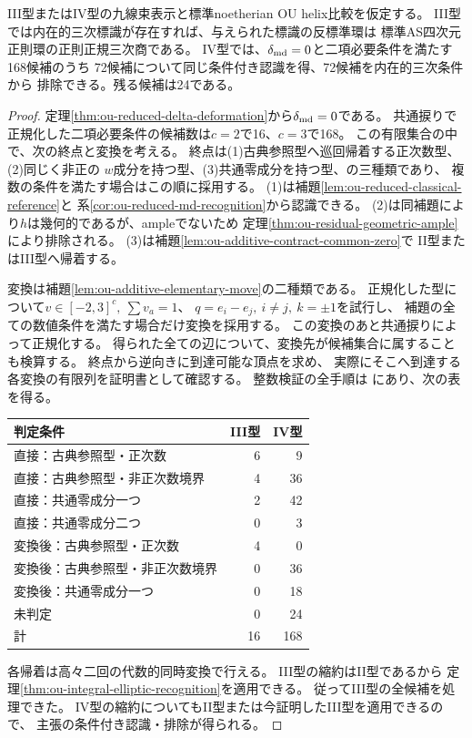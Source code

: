 \begin{theorem}[III型の完全認識とIV型の代数的帰着]
\label{thm:ou-additive-partial-recognition}
III型またはIV型の九線束表示と標準noetherian OU helix比較を仮定する。
III型では内在的三次標識が存在すれば、与えられた標識の反標準環は
標準AS四次元正則環の正則正規三次商である。
IV型では、$\delta_{\rm md}=0$と二項必要条件を満たす168候補のうち
72候補について同じ条件付き認識を得、72候補を内在的三次条件から
排除できる。残る候補は24である。
\end{theorem}
\begin{proof}
定理\ref{thm:ou-reduced-delta-deformation}から$\delta_{\rm md}=0$である。
共通捩りで正規化した二項必要条件の候補数は$c=2$で16、$c=3$で168。
この有限集合の中で、次の終点と変換を考える。
終点は(1)古典参照型へ巡回帰着する正次数型、(2)同じく非正の
$w$成分を持つ型、(3)共通零成分を持つ型、の三種類であり、
複数の条件を満たす場合はこの順に採用する。
(1)は補題\ref{lem:ou-reduced-classical-reference}と
系\ref{cor:ou-reduced-md-recognition}から認識できる。
(2)は同補題により$h$は幾何的であるが、ampleでないため
定理\ref{thm:ou-residual-geometric-ample}により排除される。
(3)は補題\ref{lem:ou-additive-contract-common-zero}で
II型またはIII型へ帰着する。

変換は補題\ref{lem:ou-additive-elementary-move}の二種類である。
正規化した型について$v\in[-2,3]^c,\ \sum v_a=1$、
$q=e_i-e_j,\ i\ne j,\ k=\pm1$を試行し、
補題の全ての数値条件を満たす場合だけ変換を採用する。
この変換のあと共通捩りによって正規化する。
得られた全ての辺について、変換先が候補集合に属することも検算する。
終点から逆向きに到達可能な頂点を求め、
実際にそこへ到達する各変換の有限列を証明書として確認する。
整数検証の全手順は
にあり、次の表を得る。
\begin{center}
\begin{tabular}{lrr}
\toprule
判定条件 & III型 & IV型\\
\midrule
直接：古典参照型・正次数 &6&9\\
直接：古典参照型・非正次数境界 &4&36\\
直接：共通零成分一つ &2&42\\
直接：共通零成分二つ &0&3\\
変換後：古典参照型・正次数 &4&0\\
変換後：古典参照型・非正次数境界 &0&36\\
変換後：共通零成分一つ &0&18\\
未判定 &0&24\\
\midrule
計 &16&168\\
\bottomrule
\end{tabular}
\end{center}
各帰着は高々二回の代数的同時変換で行える。
III型の縮約はII型であるから
定理\ref{thm:ou-integral-elliptic-recognition}を適用できる。
従ってIII型の全候補を処理できた。
IV型の縮約についてもII型または今証明したIII型を適用できるので、
主張の条件付き認識・排除が得られる。
\end{proof}

